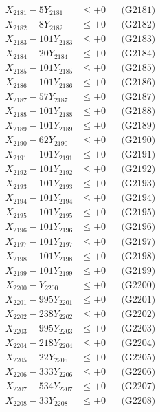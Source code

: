 \documentclass[a4paper,10pt]{article}
\begin{document}
{\begin{align}
\allowbreak
X_{2181} - 5Y_{2181} &\leq +0 && \text{(G2181)} \\
X_{2182} - 8Y_{2182} &\leq +0 && \text{(G2182)} \\
X_{2183} - 101Y_{2183} &\leq +0 && \text{(G2183)} \\
X_{2184} - 20Y_{2184} &\leq +0 && \text{(G2184)} \\
X_{2185} - 101Y_{2185} &\leq +0 && \text{(G2185)} \\
X_{2186} - 101Y_{2186} &\leq +0 && \text{(G2186)} \\
X_{2187} - 57Y_{2187} &\leq +0 && \text{(G2187)} \\
X_{2188} - 101Y_{2188} &\leq +0 && \text{(G2188)} \\
X_{2189} - 101Y_{2189} &\leq +0 && \text{(G2189)} \\
X_{2190} - 62Y_{2190} &\leq +0 && \text{(G2190)} \\
\allowbreak
X_{2191} - 101Y_{2191} &\leq +0 && \text{(G2191)} \\
X_{2192} - 101Y_{2192} &\leq +0 && \text{(G2192)} \\
X_{2193} - 101Y_{2193} &\leq +0 && \text{(G2193)} \\
X_{2194} - 101Y_{2194} &\leq +0 && \text{(G2194)} \\
X_{2195} - 101Y_{2195} &\leq +0 && \text{(G2195)} \\
X_{2196} - 101Y_{2196} &\leq +0 && \text{(G2196)} \\
X_{2197} - 101Y_{2197} &\leq +0 && \text{(G2197)} \\
X_{2198} - 101Y_{2198} &\leq +0 && \text{(G2198)} \\
X_{2199} - 101Y_{2199} &\leq +0 && \text{(G2199)} \\
X_{2200} - Y_{2200} &\leq +0 && \text{(G2200)} \\
\allowbreak
X_{2201} - 995Y_{2201} &\leq +0 && \text{(G2201)} \\
X_{2202} - 238Y_{2202} &\leq +0 && \text{(G2202)} \\
X_{2203} - 995Y_{2203} &\leq +0 && \text{(G2203)} \\
X_{2204} - 218Y_{2204} &\leq +0 && \text{(G2204)} \\
X_{2205} - 22Y_{2205} &\leq +0 && \text{(G2205)} \\
X_{2206} - 333Y_{2206} &\leq +0 && \text{(G2206)} \\
X_{2207} - 534Y_{2207} &\leq +0 && \text{(G2207)} \\
X_{2208} - 33Y_{2208} &\leq +0 && \text{(G2208)} \\

\end{align}}
\end{document}

